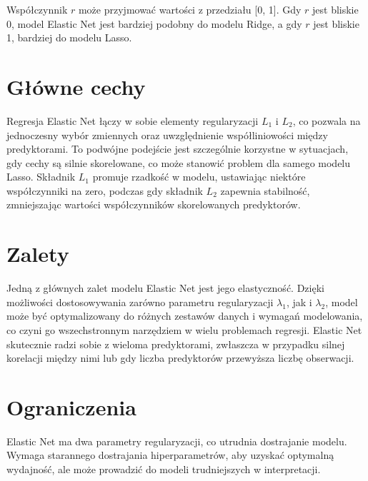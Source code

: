 \hspace{1.5cm} Współczynnik $r$ może przyjmować wartości z przedziału [0, 1]. Gdy $r$ jest bliskie 0, model Elastic Net jest bardziej podobny do modelu Ridge, a gdy $r$ jest bliskie 1, bardziej do modelu Lasso.

{}
\section*{Główne cechy}
\vspace{-1.0em}
\label{sec:why_use_ml}

\hspace{1.5cm} Regresja Elastic Net łączy w sobie elementy regularyzacji $L_1$ i $L_2$, co pozwala na jednoczesny wybór zmiennych oraz uwzględnienie współliniowości między predyktorami. To podwójne podejście jest szczególnie korzystne w sytuacjach, gdy cechy są silnie skorelowane, co może stanowić problem dla samego modelu Lasso. Składnik $L_1$ promuje rzadkość w modelu, ustawiając niektóre współczynniki na zero, podczas gdy składnik $L_2$ zapewnia stabilność, zmniejszając wartości współczynników skorelowanych predyktorów.


{}
\section*{Zalety }
\vspace{-1.0em}
\label{sec:ml_challenges}


\hspace{1.5cm} Jedną z głównych zalet modelu Elastic Net jest jego elastyczność.
Dzięki możliwości dostosowywania zarówno parametru regularyzacji $\lambda_1$, jak i $\lambda_2$, model może być optymalizowany do różnych zestawów danych i wymagań modelowania, co czyni go wszechstronnym narzędziem w wielu problemach regresji.
Elastic Net skutecznie radzi sobie z wieloma predyktorami, zwłaszcza w przypadku silnej korelacji między nimi lub gdy liczba predyktorów przewyższa liczbę obserwacji.

{}
\section*{Ograniczenia }
\vspace{-1.0em}
\label{sec:ml_challenges}

\hspace{1.5cm} Elastic Net ma dwa parametry regularyzacji, co utrudnia dostrajanie modelu. Wymaga starannego dostrajania hiperparametrów, aby uzyskać optymalną wydajność, ale może prowadzić do modeli trudniejszych w interpretacji.


